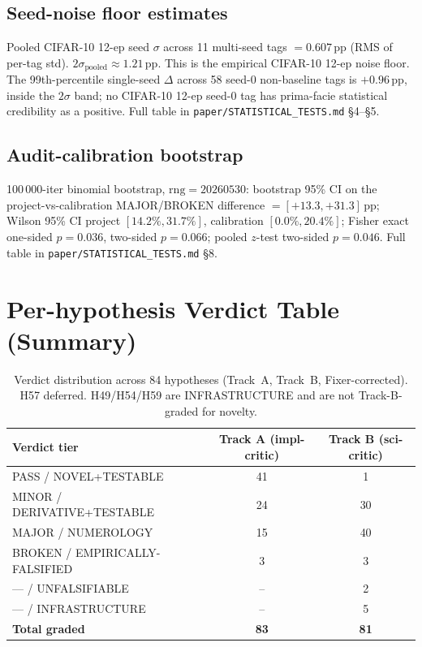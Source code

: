 \documentclass{article}
\begin{document}
\subsection{Seed-noise floor estimates}
\label{app:noise}

Pooled CIFAR-10 12-ep seed $\sigma$ across 11 multi-seed tags
$= 0.607$\,pp (RMS of per-tag std). $2\sigma_{\mathrm{pooled}}
\approx 1.21$\,pp. This is the empirical CIFAR-10 12-ep noise floor.
The 99th-percentile single-seed $\Delta$ across 58 seed-0
non-baseline tags is $+0.96$\,pp, inside the $2\sigma$ band; no
CIFAR-10 12-ep seed-0 tag has prima-facie statistical credibility as
a positive. Full table in
\texttt{paper/STATISTICAL\_TESTS.md} \S4--\S5.

\subsection{Audit-calibration bootstrap}
\label{app:bootstrap}

100\,000-iter binomial bootstrap, $\mathrm{rng}=20260530$:
bootstrap 95\% CI on the project-vs-calibration MAJOR/BROKEN
difference $= [+13.3, +31.3]$\,pp; Wilson 95\% CI project
$[14.2\%, 31.7\%]$, calibration $[0.0\%, 20.4\%]$; Fisher exact
one-sided $p=0.036$, two-sided $p=0.066$; pooled $z$-test two-sided
$p=0.046$. Full table in \texttt{paper/STATISTICAL\_TESTS.md} \S8.

\section{Per-hypothesis Verdict Table (Summary)}
\label{app:verdicts}

\begin{table}[h!]
\small\centering
\caption{Verdict distribution across 84 hypotheses (Track~A, Track~B,
Fixer-corrected). H57 deferred. H49/H54/H59 are INFRASTRUCTURE and
are not Track-B-graded for novelty.}
\label{tab:verdicts}
\begin{tabular}{l c c}
\toprule
Verdict tier & Track A (impl-critic) & Track B (sci-critic) \\
\midrule
PASS / NOVEL+TESTABLE        & 41 & 1 \\
MINOR / DERIVATIVE+TESTABLE  & 24 & 30 \\
MAJOR / NUMEROLOGY           & 15 & 40 \\
BROKEN / EMPIRICALLY-FALSIFIED & 3  & 3 \\
--- / UNFALSIFIABLE          & -- & 2 \\
--- / INFRASTRUCTURE         & -- & 5 \\
\midrule
\textbf{Total graded}        & \textbf{83} & \textbf{81} \\
\bottomrule
\end{tabular}
\end{table}
\end{document}
